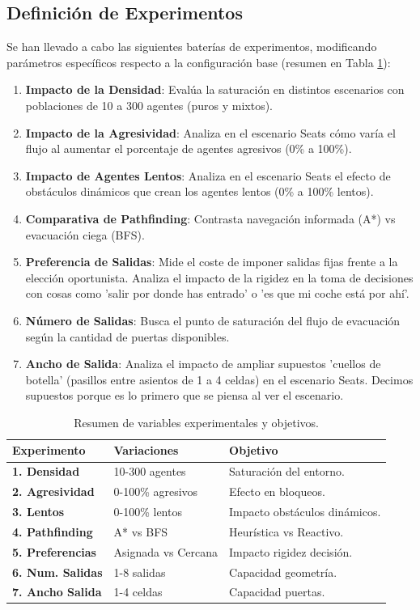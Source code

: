 \documentclass[11pt,spanish,listoffigures,listoftables]{tfgetsinf}
\begin{document}
\subsection{Definición de Experimentos}
Se han llevado a cabo las siguientes baterías de experimentos, modificando parámetros específicos respecto a la configuración base (resumen en Tabla \ref{tab:experiment_definition}):

\begin{enumerate}
    \item \textbf{Impacto de la Densidad}: Evalúa la saturación en distintos escenarios con poblaciones de 10 a 300 agentes (puros y mixtos).
    \item \textbf{Impacto de la Agresividad}: Analiza en el escenario Seats cómo varía el flujo al aumentar el porcentaje de agentes agresivos (0\% a 100\%).
    \item \textbf{Impacto de Agentes Lentos}: Analiza en el escenario Seats el efecto de obstáculos dinámicos que crean los agentes lentos (0\% a 100\% lentos).
    \item \textbf{Comparativa de Pathfinding}: Contrasta navegación informada (A*) vs evacuación ciega (BFS).
    \item \textbf{Preferencia de Salidas}: Mide el coste de imponer salidas fijas frente a la elección oportunista. Analiza el impacto de la rigidez en la toma de decisiones con cosas como 'salir por donde has entrado' o 'es que mi coche está por ahí'.
    \item \textbf{Número de Salidas}: Busca el punto de saturación del flujo de evacuación según la cantidad de puertas disponibles.
    \item \textbf{Ancho de Salida}: Analiza el impacto de ampliar supuestos 'cuellos de botella' (pasillos entre asientos de 1 a 4 celdas) en el escenario Seats. Decimos supuestos porque es lo primero que se piensa al ver el escenario. 
\end{enumerate}

\begin{table}[H]
\centering
\begin{tabularx}{\textwidth}{|l|l|X|}
\hline
\textbf{Experimento} & \textbf{Variaciones} & \textbf{Objetivo} \\
\hline
\textbf{1. Densidad} & 10-300 agentes & Saturación del entorno. \\
\hline
\textbf{2. Agresividad} & 0-100\% agresivos & Efecto en bloqueos. \\
\hline
\textbf{3. Lentos} & 0-100\% lentos & Impacto obstáculos dinámicos. \\
\hline
\textbf{4. Pathfinding} & A* vs BFS & Heurística vs Reactivo. \\
\hline
\textbf{5. Preferencias} & Asignada vs Cercana & Impacto rigidez decisión. \\
\hline
\textbf{6. Num. Salidas} & 1-8 salidas & Capacidad geometría. \\
\hline
\textbf{7. Ancho Salida} & 1-4 celdas & Capacidad puertas. \\
\hline
\end{tabularx}
\caption{Resumen de variables experimentales y objetivos.}
\label{tab:experiment_definition}
\end{table}
\end{document}
